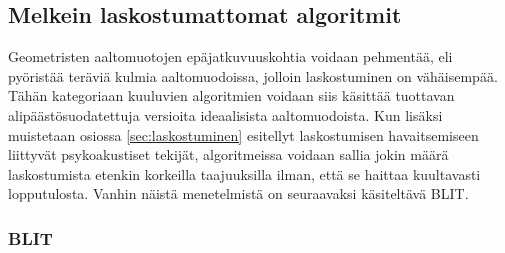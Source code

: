 \documentclass[finnish,12pt,a4paper,pdftex]{article} %
\begin{document}
\subsection{Melkein laskostumattomat algoritmit}

Geometristen aaltomuotojen epäjatkuvuuskohtia voidaan pehmentää, eli pyöristää teräviä kulmia aaltomuodoissa, jolloin laskostuminen on vähäisempää. Tähän kategoriaan kuuluvien algoritmien voidaan siis käsittää tuottavan alipäästösuodatettuja versioita ideaalisista aaltomuodoista. Kun lisäksi muistetaan osiossa \ref{sec:laskostuminen} esitellyt laskostumisen havaitsemiseen liittyvät psykoakustiset tekijät, algoritmeissa voidaan sallia jokin määrä laskostumista etenkin korkeilla taajuuksilla ilman, että se haittaa kuultavasti lopputulosta. Vanhin näistä menetelmistä on seuraavaksi käsiteltävä BLIT. \cite{Pekonen2014, Nostalgia}

\subsubsection{BLIT}
\end{document}
